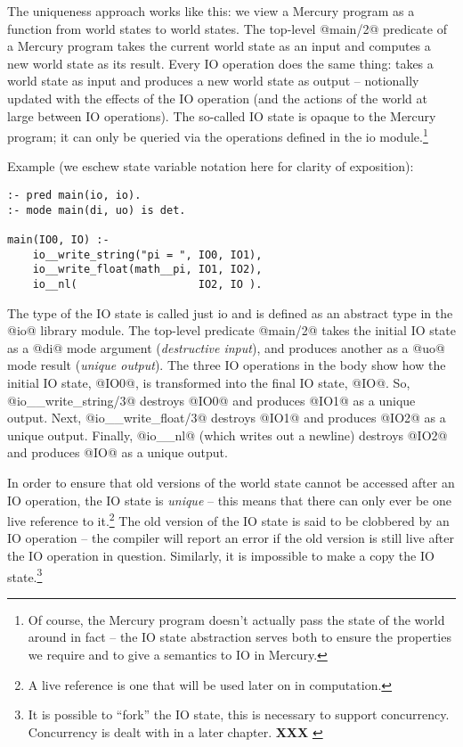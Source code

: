 \documentclass[a4paper,11pt,notitlepage,onecolumn]{article}
\newcommand{\XXX}[1]%
{{\small\textbf{XXX} \emph{#1}}}
\begin{document}
The uniqueness approach works like this: we view a Mercury
program as a function from world states to world states.  The
top-level @main/2@ predicate of a Mercury program takes the
current world state as an input and computes a new world state
as its result.  Every IO operation does the same thing: takes
a world state as input and produces a new world state as
output -- notionally updated with the effects of the IO
operation (and the actions of the world at large between IO
operations).  The so-called IO state is opaque to the Mercury
program; it can only be queried via the operations defined in
the io module.\footnote{Of course, the Mercury program doesn't actually
pass the state of the world around in fact -- the IO state
abstraction serves both to ensure the properties we require
and to give a semantics to IO in Mercury.}

Example (we eschew state variable notation here for clarity of
exposition):
\begin{verbatim}
:- pred main(io, io).
:- mode main(di, uo) is det.

main(IO0, IO) :-
    io__write_string("pi = ", IO0, IO1),
    io__write_float(math__pi, IO1, IO2),
    io__nl(                   IO2, IO ).
\end{verbatim}
The type of the IO state is called just io and is defined
as an abstract type in the @io@ library module.  The
top-level predicate @main/2@ takes the initial IO state as a
@di@ mode argument (\emph{destructive input}), and produces another as a
@uo@ mode result (\emph{unique output}).  The three IO operations in the body
show how the initial IO state, @IO0@, is transformed into
the final IO state, @IO@.  So, @io__write_string/3@ destroys
@IO0@ and produces @IO1@ as a unique output.  Next,
@io__write_float/3@ destroys @IO1@ and produces @IO2@ as a
unique output.  Finally, @io__nl@ (which writes out a
newline) destroys @IO2@ and produces @IO@ as a unique output.

In order to ensure that old versions of the world state cannot
be accessed after an IO operation, the IO state is \emph{unique} --
this means that there can only ever be one live reference to
it.\footnote{A live reference is one that will be used
later on in computation.}  The old version of the IO state
is said to be clobbered by an IO operation -- the compiler will
report an error if the old version is still live after the IO
operation in question.  Similarly, it is impossible to make a
copy the IO state.\footnote{It is possible to ``fork'' the IO
state, this is necessary to support concurrency.  Concurrency
is dealt with in a later chapter. \XXX{}}
\end{document}
